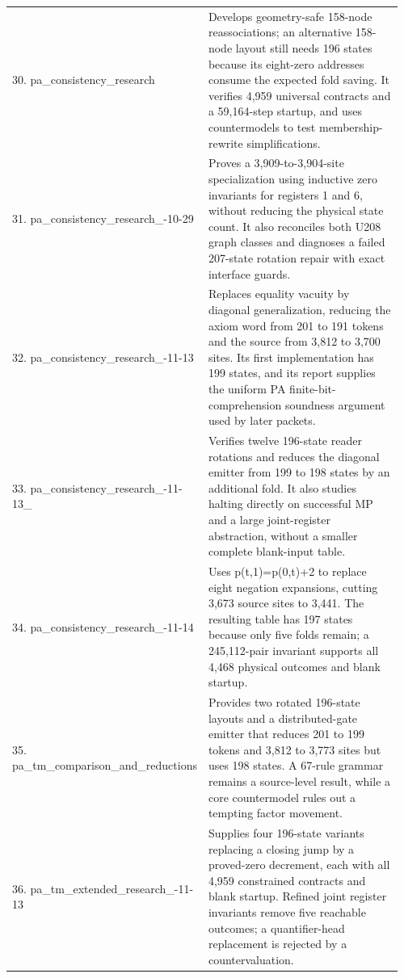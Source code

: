 \begin{longtable}{@{}p{0.35\linewidth}p{0.61\linewidth}@{}}
30. pa\_\allowbreak consistency\_\allowbreak research & Develops geometry-safe 158-node reassociations; an alternative 158-node layout still needs 196 states because its eight-zero addresses consume the expected fold saving. It verifies 4,959 universal contracts and a 59,164-step startup, and uses countermodels to test membership-rewrite simplifications.\\[4pt]
31. pa\_\allowbreak consistency\_\allowbreak research\_\allowbreak 2026-10-29 & Proves a 3,909-to-3,904-site specialization using inductive zero invariants for registers 1 and 6, without reducing the physical state count. It also reconciles both U208 graph classes and diagnoses a failed 207-state rotation repair with exact interface guards.\\[4pt]
32. pa\_\allowbreak consistency\_\allowbreak research\_\allowbreak 2026-11-13 & Replaces equality vacuity by diagonal generalization, reducing the axiom word from 201 to 191 tokens and the source from 3,812 to 3,700 sites. Its first implementation has 199 states, and its report supplies the uniform PA finite-bit-comprehension soundness argument used by later packets.\\[4pt]
33. pa\_\allowbreak consistency\_\allowbreak research\_\allowbreak 2026-11-13\_\allowbreak 2 & Verifies twelve 196-state reader rotations and reduces the diagonal emitter from 199 to 198 states by an additional fold. It also studies halting directly on successful MP and a large joint-register abstraction, without a smaller complete blank-input table.\\[4pt]
34. pa\_\allowbreak consistency\_\allowbreak research\_\allowbreak 2026-11-14 & Uses p(t,1)=p(0,t)+2 to replace eight negation expansions, cutting 3,673 source sites to 3,441. The resulting table has 197 states because only five folds remain; a 245,112-pair invariant supports all 4,468 physical outcomes and blank startup.\\[4pt]
35. pa\_\allowbreak tm\_\allowbreak comparison\_\allowbreak and\_\allowbreak reductions & Provides two rotated 196-state layouts and a distributed-gate emitter that reduces 201 to 199 tokens and 3,812 to 3,773 sites but uses 198 states. A 67-rule grammar remains a source-level result, while a core countermodel rules out a tempting factor movement.\\[4pt]
36. pa\_\allowbreak tm\_\allowbreak extended\_\allowbreak research\_\allowbreak 2026-11-13 & Supplies four 196-state variants replacing a closing jump by a proved-zero decrement, each with all 4,959 constrained contracts and blank startup. Refined joint register invariants remove five reachable outcomes; a quantifier-head replacement is rejected by a countervaluation.\\[4pt]

\end{longtable}

